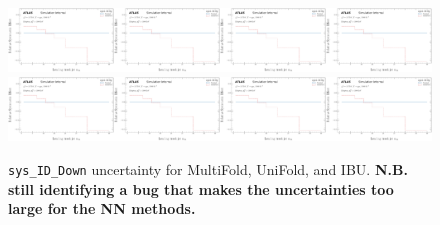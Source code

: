 \begin{figure}[h!]
\includegraphics[width=0.25\textwidth,page=130]{figures/SimResults/Lepton_SystEffect.pdf}\includegraphics[width=0.25\textwidth,page=138]{figures/SimResults/Lepton_SystEffect.pdf}\includegraphics[width=0.25\textwidth,page=146]{figures/SimResults/Lepton_SystEffect.pdf}\includegraphics[width=0.25\textwidth,page=154]{figures/SimResults/Lepton_SystEffect.pdf}\\
\includegraphics[width=0.25\textwidth,page=162]{figures/SimResults/Lepton_SystEffect.pdf}\includegraphics[width=0.25\textwidth,page=170]{figures/SimResults/Lepton_SystEffect.pdf}\includegraphics[width=0.25\textwidth,page=178]{figures/SimResults/Lepton_SystEffect.pdf}\includegraphics[width=0.25\textwidth,page=186]{figures/SimResults/Lepton_SystEffect.pdf}
\caption{\texttt{sys\_ID\_Down} uncertainty for MultiFold, UniFold, and IBU.  \textbf{N.B. still identifying a bug that makes the uncertainties too large for the NN methods.}}
\label{fig:simresultsmulti_Leptonuncertsl2}
\end{figure}

